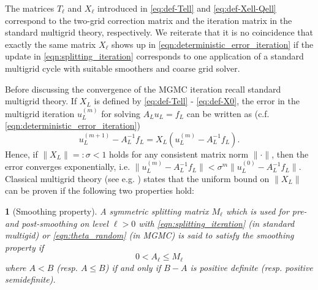 \documentclass[11pt,english]{article}
\theoremstyle{plain}
\theoremstyle{plain}
\newtheorem{definition}[thm]{\protect\definitionname}
\theoremstyle{plain}
\theoremstyle{plain}
\numberwithin{equation}{section}
\providecommand{\definitionname}{Definition}
\begin{document}
The matrices $T_{\ell}$ and $X_{\ell}$ introduced in \eqref{eq:def-Tell} and \eqref{eq:def-Xell-Qell} correspond to the two-grid correction matrix and the iteration matrix in the standard multigrid theory, respectively. We reiterate that it is no coincidence that exactly the same matrix $X_\ell$ shows up in \eqref{eqn:deterministic_error_iteration} if the update in \eqref{eqn:splitting_iteration} corresponds to one application of a standard multigrid cycle with suitable smoothers and coarse grid solver.

Before discussing the convergence of the MGMC iteration recall standard multigrid theory. If $X_{L}$ is defined by \eqref{eq:def-Tell} - \eqref{eq:def-X0}, the error in the multigrid iteration $u_{L}^{(m)}$
for solving $A_{L}u_{L}=f_{L}$ can be written as (c.f. \eqref{eqn:deterministic_error_iteration})
\begin{equation}
	u_{L}^{(m+1)}-A_{L}^{-1}f_{L}=X_{L}(u_{L}^{(m)}-A_{L}^{-1}f_{L}).\label{eqn:multigrid_error_iteration}
\end{equation}
Hence, if $\|X_{L}\|=:\sigma<1$ holds for any consistent matrix norm $\|\cdot\|$, then the error converges exponentially, i.e. $\|u_{L}^{(m)}-A_{L}^{-1}f_{L}\|
	<
	\sigma^{m}\|u_{L}^{(0)}-A_{L}^{-1}f_{L}\|$.
Classical multigrid theory (see e.g. \cite{Hackbusch.W_1985_MultiGridMethodsApplications}) states that the uniform bound on $\|X_{L}\|$ can be proven if the following two properties hold:
\begin{definition}[Smoothing property]\label{def:smoothing_property}
	A symmetric splitting matrix $M_\ell$ which is used for pre- and post-smoothing on level $\ell>0$ with \eqref{eqn:splitting_iteration} (in standard multigid) or \eqref{eqn:theta_random} (in MGMC) is said to satisfy the smoothing property if
	\[
		0<A_{\ell}\leq M_{\ell}
	\]
	where $A<B$ (resp. $A\leq B$) if and only if $B-A$ is positive definite (resp. positive semidefinite).
\end{definition}
\end{document}
